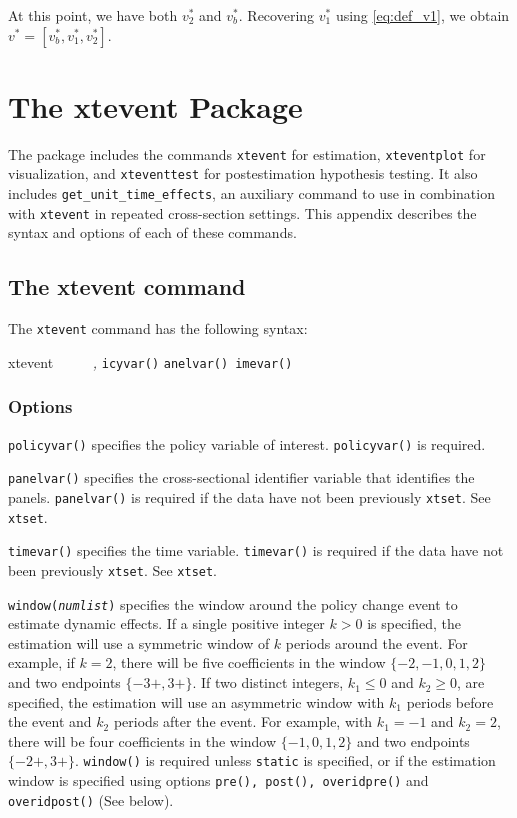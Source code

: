 \documentclass[12pt]{article}
\begin{document}
At this point, we have both $v^*_2$ and $v^*_b$.
Recovering $v^*_1$ using \eqref{eq:def_v1}, we obtain $v^*=[v^*_b, v^*_1,  v^*_2]$.




\section{The xtevent Package}
\label{sec:package}
The \xtevent package includes the commands \texttt{xtevent} for estimation, \texttt{xteventplot} for visualization, and \texttt{xteventtest} for postestimation hypothesis testing. It also includes \texttt{get\_unit\_time\_effects}, an auxiliary command to use in combination with \texttt{xtevent} in repeated cross-section settings. This appendix describes the syntax and options of each of these commands.

\subsection{The xtevent command}
The \texttt{xtevent} command has the following syntax:

\begin{stsyntax}
	xtevent
	\depvar\
	\optindepvars\
	\optif\
	\optin\
	\optweight\
	\emph{,}
	\texttt{icyvar(\varname)}
	\texttt{anelvar(\varname)}\
	\texttt{imevar(\varname)}\
	
\end{stsyntax}




\subsubsection{Options}
\hangpara
\texttt{policyvar(\varname)} specifies the policy variable of interest. \texttt{policyvar()} is required.

\hangpara
\texttt{panelvar(\varname)} specifies the cross-sectional identifier variable that identifies the panels.
\texttt{panelvar()} is required if the data have not been  previously \texttt{xtset}. See \texttt{xtset}.

\hangpara
\texttt{timevar(\varname)} specifies the time variable. \texttt{timevar()} is required if the data have not been previously \texttt{xtset}. See \texttt{xtset}.

\hangpara
{\tt window({\it numlist})} specifies the window around the policy change event to estimate dynamic effects. If a single positive integer $k>0$ is specified, the estimation will use a symmetric window of $k$ periods around the event.
For example, if $k = 2$, there will be five coefficients in the window $\{-2,-1,0,1,2\}$ and two endpoints $\{-3+, 3+\}$.
If two distinct integers, $k_1\le0$ and $k_2\ge0$, are specified, the estimation will use an asymmetric window with $k_1$ periods before the event and $k_2$ periods after the event.
For example, with $k_1 = -1$ and $k_2 = 2$, there will be four coefficients in the window $\{-1,0,1,2\}$ and two endpoints $\{-2+,3+\}$.
{\tt window()} is required unless {\tt static} is specified, or if the estimation window is specified using options {\tt pre(), post(), overidpre()} and {\tt overidpost()} (See below).
\end{document}
